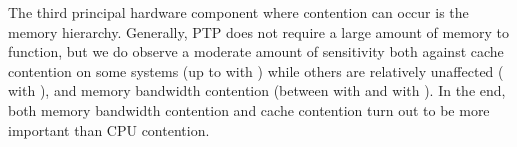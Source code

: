 %
The third principal hardware component where contention can occur is the memory hierarchy. Generally, PTP does not require a large amount of memory to function, but we do observe a moderate amount of sensitivity both against cache contention on some systems (up to \fRatio[1]{\cmpMax} with \fVendorCluster{\cmpMaxArg}) while others are relatively unaffected (\fRatio[0]{\cmpMin} with \fVendorCluster{\cmpMinArg}),%
%
%
%
and memory bandwidth contention (between \fRatio[0]{\cmpMin} with \fVendorCluster{\cmpMinArg} and \fRatio{\cmpMax} with \fVendorCluster{\cmpMaxArg}).
%
In the end, both memory bandwidth contention and cache contention turn out to be more important than CPU contention.%
%

%

